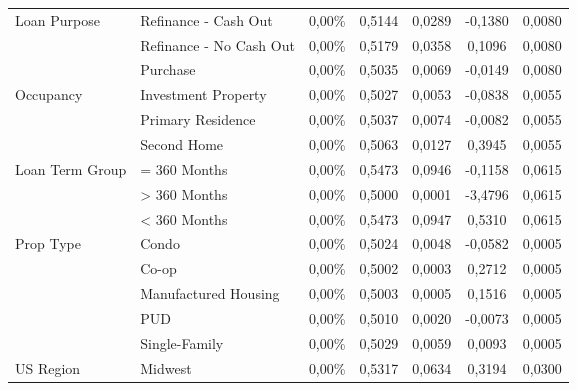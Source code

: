 {\begin{longtable}{ p{3cm} p{4cm} c c c c c}
Loan Purpose                & Refinance - Cash Out               								& 0,00\%  & 0,5144 & 0,0289 & -0,1380 & 0,0080 \\
                            & Refinance - No Cash Out 											& 0,00\%  & 0,5179 & 0,0358 & 0,1096  & 0,0080 \\
                            & Purchase                                                          & 0,00\%  & 0,5035 & 0,0069 & -0,0149 & 0,0080 \\\hline
Occupancy                   & Investment Property                                               & 0,00\%  & 0,5027 & 0,0053 & -0,0838 & 0,0055 \\
                            & Primary Residence                                                 & 0,00\%  & 0,5037 & 0,0074 & -0,0082 & 0,0055 \\
                            & Second Home                                                       & 0,00\%  & 0,5063 & 0,0127 & 0,3945  & 0,0055 \\\hline
Loan Term Group             & = 360 Months                                                      & 0,00\%  & 0,5473 & 0,0946 & -0,1158 & 0,0615 \\
                            & \textgreater{} 360 Months                                         & 0,00\%  & 0,5000 & 0,0001 & -3,4796 & 0,0615 \\
                            & \textless{} 360 Months                                            & 0,00\%  & 0,5473 & 0,0947 & 0,5310  & 0,0615 \\\hline
Prop Type                   & Condo                                                             & 0,00\%  & 0,5024 & 0,0048 & -0,0582 & 0,0005 \\
                            & Co-op                                                             & 0,00\%  & 0,5002 & 0,0003 & 0,2712  & 0,0005 \\
                            & Manufactured Housing    											& 0,00\%  & 0,5003 & 0,0005 & 0,1516  & 0,0005 \\
                            & PUD                                                               & 0,00\%  & 0,5010 & 0,0020 & -0,0073 & 0,0005 \\
                            & Single-Family                                                     & 0,00\%  & 0,5029 & 0,0059 & 0,0093  & 0,0005 \\\hline
US Region                   & Midwest                                                           & 0,00\%  & 0,5317 & 0,0634 & 0,3194  & 0,0300 \\

\end{longtable}}

